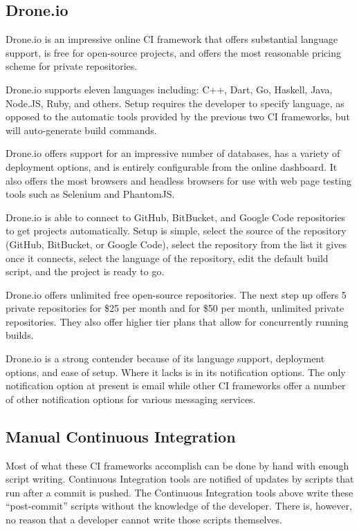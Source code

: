 \documentclass[12pt]{ucthesis}
\begin{document}
\subsection{Drone.io}
Drone.io\cite{DroneIO} is an impressive online CI framework that offers substantial language support, is free for open-source projects, and offers the most reasonable pricing scheme for private repositories.

Drone.io supports eleven languages including: C++, Dart, Go, Haskell, Java, Node.JS, Ruby, and others. Setup requires the developer to specify language, as opposed to the automatic tools provided by the previous two CI frameworks, but will auto-generate build commands.

Drone.io offers support for an impressive number of databases, has a variety of deployment options, and is entirely configurable from the online dashboard. It also offers the most browsers and headless browsers for use with web page testing tools such as Selenium and PhantomJS.

Drone.io is able to connect to GitHub, BitBucket, and Google Code repositories to get projects automatically. Setup is simple, select the source of the repository (GitHub, BitBucket, or Google Code), select the repository from the list it gives once it connects, select the language of the repository, edit the default build script, and the project is ready to go.

Drone.io offers unlimited free open-source repositories. The next step up offers 5 private repositories for \$25 per month and for \$50 per month, unlimited private repositories. They also offer higher tier plans that allow for concurrently running builds.

Drone.io is a strong contender because of its language support, deployment options, and ease of setup. Where it lacks is in its notification options. The only notification option at present is email while other CI frameworks offer a number of other notification options for various messaging services.

\subsection{Manual Continuous Integration}
Most of what these CI frameworks accomplish can be done by hand with enough script writing. Continuous Integration tools are notified of updates by scripts that run after a commit is pushed. The Continuous Integration tools above write these ``post-commit'' scripts without the knowledge of the developer. There is, however, no reason that a developer cannot write those scripts themselves.
\end{document}
